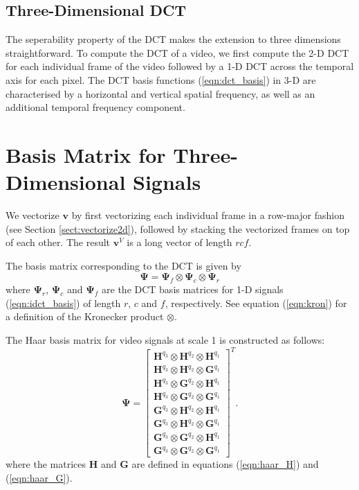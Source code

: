 \subsection{Three-Dimensional DCT}
The seperability property of the DCT makes the extension to three dimensions straightforward.
To compute the DCT of a video, we first compute the 2-D DCT for each individual frame of the video followed by a 1-D DCT across the temporal axis for each pixel.
The DCT basis functions (\ref{eqn:dct_basis}) in 3-D are characterised by a horizontal and vertical spatial frequency, as well as an additional temporal frequency component.

\section{Basis Matrix for Three-Dimensional Signals}
We vectorize $\bm v$ by first vectorizing each individual frame in a row-major fashion (see Section \ref{sect:vectorize2d}), followed by stacking the vectorized frames on top of each other.
The result $\bm v^V$ is a long vector of length $rcf$.

The basis matrix corresponding to the DCT is given by 
\begin{equation*}
  \bm\Psi = \bm\Psi_f\otimes\bm\Psi_c\otimes\bm\Psi_r
\end{equation*}
where $\bm\Psi_r$, $\bm\Psi_c$ and $\bm\Psi_f$ are the DCT basis matrices for 1-D signals (\ref{eqn:idct_basis}) of length $r$, $c$ and $f$, respectively.
See equation (\ref{eqn:kron}) for a definition of the Kronecker product $\otimes$.

The Haar basis matrix for video signals at scale 1 is constructed as follows:
\begin{equation*}
  \bm\Psi = 
  \begin{bmatrix}
    \bm H^{q_3}\otimes \bm H^{q_2} \otimes\bm H^{q_1} \\
    \bm H^{q_3}\otimes \bm H^{q_2} \otimes \bm G^{q_1} \\
    \bm H^{q_3}\otimes \bm G^{q_2} \otimes \bm H^{q_1} \\
    \bm H^{q_3}\otimes \bm G^{q_2} \otimes \bm G^{q_1} \\
    \bm G^{q_3}\otimes \bm H^{q_2} \otimes\bm H^{q_1} \\
    \bm G^{q_3}\otimes \bm H^{q_2} \otimes \bm G^{q_1} \\
    \bm G^{q_3}\otimes \bm G^{q_2} \otimes \bm H^{q_1} \\
    \bm G^{q_3}\otimes \bm G^{q_2} \otimes \bm G^{q_1} 
  \end{bmatrix}^T.
\end{equation*}
where the matrices $\bm H$ and $\bm G$ are defined in equations (\ref{eqn:haar_H}) and (\ref{eqn:haar_G}).

